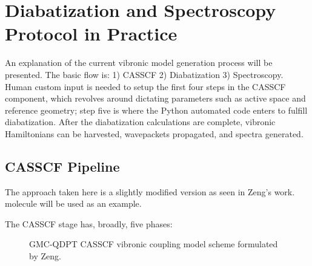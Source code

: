 \chapter{Diabatization and Spectroscopy Protocol in Practice} %
An explanation of the current vibronic model generation process will be presented. The basic flow is: 1) CASSCF 2) Diabatization 3) Spectroscopy. Human custom input is needed to setup the first four steps in the CASSCF component, which revolves around dictating parameters such as active space and reference geometry; step five is where the Python automated code enters to fulfill diabatization. After the diabatization calculations are complete, vibronic Hamiltonians can be harvested, wavepackets propagated, and spectra generated.
\section{CASSCF Pipeline} 
The approach taken here is a slightly modified version as seen in %
Zeng's work.  molecule will be used as an example.
\newpage

The CASSCF stage has, broadly, five phases:

\begin{figure}[!ht]
    \caption{\small{GMC-QDPT CASSCF vibronic coupling model scheme formulated by Zeng.}}
\end{figure}


